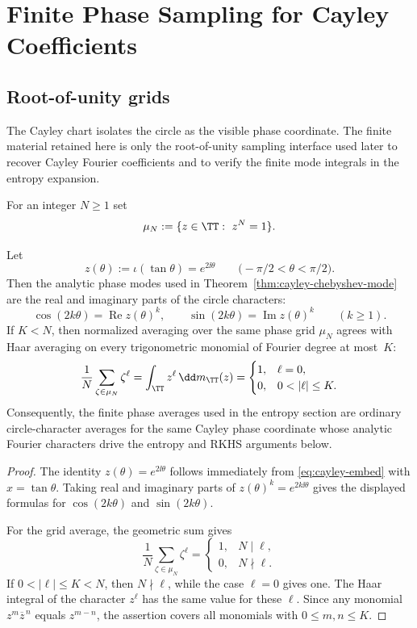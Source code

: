 \section{Finite Phase Sampling for Cayley Coefficients}%
\label{sec:finite-phase-sampling}

\subsection{Root-of-unity grids}

The Cayley chart isolates the circle as the visible phase coordinate.  The
finite material retained here is only the root-of-unity sampling interface
used later to recover Cayley Fourier coefficients and to verify the finite
mode integrals in the entropy expansion.

\begin{definition}\label{def:finite-phase-grid}
For an integer $N\ge1$ set
\[
\mu_N:=\{z\in\TT:\ z^N=1\}.
\]
\end{definition}

\begin{proposition}%
\label{prop:phase-coordinate-interface}
Let
\[
z(\theta):=\iota(\tan\theta)=e^{2\ii\theta}
\qquad\bigl(-\pi/2<\theta<\pi/2\bigr).
\]
Then the analytic phase modes used in
Theorem~\ref{thm:cayley-chebyshev-mode} are the real and imaginary parts
of the circle characters:
\[
\cos(2k\theta)=\operatorname{Re} z(\theta)^k,
\qquad
\sin(2k\theta)=\operatorname{Im} z(\theta)^k
\qquad(k\ge1).
\]
If $K<N$, then normalized averaging over the same phase grid
$\mu_N$ agrees with Haar averaging on every trigonometric monomial of
Fourier degree at most~$K$:
\[
\frac1N\sum_{\zeta\in\mu_N}\zeta^\ell
=\int_{\TT} z^\ell\,\dd m_{\TT}(z)
=
\begin{cases}
1,& \ell=0,\\
0,& 0<|\ell|\le K.
\end{cases}
\]
Consequently, the finite phase averages used in the entropy section are
ordinary circle-character averages for the same Cayley phase coordinate
whose analytic Fourier characters drive the entropy and RKHS arguments
below.
\end{proposition}

\begin{proof}
The identity $z(\theta)=e^{2\ii\theta}$ follows immediately from
\eqref{eq:cayley-embed} with $x=\tan\theta$.  Taking real and imaginary
parts of $z(\theta)^k=e^{2k\ii\theta}$ gives the displayed formulas for
$\cos(2k\theta)$ and $\sin(2k\theta)$.

For the grid average, the geometric sum gives
\[
\frac1N\sum_{\zeta\in\mu_N}\zeta^\ell
=
\begin{cases}
1,& N\mid \ell,\\
0,& N\nmid \ell.
\end{cases}
\]
If $0<|\ell|\le K<N$, then $N\nmid\ell$, while the case $\ell=0$ gives
one.  The Haar integral of the character $z^\ell$ has the same value for
these $\ell$.  Since any monomial $z^m\overline z^{\,n}$ equals
$z^{m-n}$, the assertion covers all monomials with
$0\le m,n\le K$.
\end{proof}

